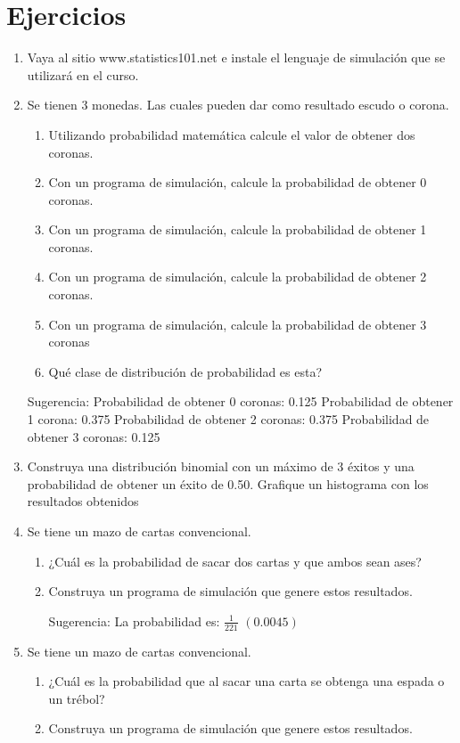  
\section{Ejercicios}

\begin{enumerate}
    \renewcommand{\theenumi}{Ejercicio \arabic{enumi}} %
    \setcounter{enumi}{0} %
    \item Vaya al sitio www.statistics101.net e instale el lenguaje de simulación que se utilizará en el curso.
    \item Se tienen 3 monedas. Las cuales pueden dar como resultado escudo o corona.
        \begin{enumerate}[label=\alph*.]
        \item Utilizando probabilidad matemática calcule el valor de obtener dos coronas.
        \item Con un programa de simulación, calcule la probabilidad de obtener 0 coronas.
        \item Con un programa de simulación, calcule la probabilidad de obtener 1 coronas.
        \item Con un programa de simulación, calcule la probabilidad de obtener 2 coronas.
        \item Con un programa de simulación, calcule la probabilidad de obtener 3 coronas
        \item Qué clase de distribución de probabilidad es esta?
      \end{enumerate}

Sugerencia:
\subitem Probabilidad de obtener 0 coronas: 0.125
\subitem Probabilidad de obtener 1 corona:  0.375
\subitem Probabilidad de obtener 2 coronas: 0.375
\subitem Probabilidad de obtener 3 coronas: 0.125

    \item Construya una distribución binomial con un máximo de 3 éxitos y una probabilidad de obtener un éxito de 0.50. Grafique un histograma con los resultados obtenidos   
    \item Se tiene un mazo de cartas convencional.
    \begin{enumerate}[label=\alph*.]
        \item ¿Cuál es la probabilidad de sacar dos cartas y que ambos sean ases?
        \item Construya un programa de simulación que genere estos resultados.

Sugerencia: La probabilidad es: $\frac{1}{221}$ $(0.0045)$
      \end{enumerate}
    \item Se tiene un mazo de cartas convencional.
        \begin{enumerate}[label=\alph*.]
        \item ¿Cuál es la probabilidad que al sacar una carta se obtenga una espada o un trébol?
        \item Construya un programa de simulación que genere estos resultados.


\end{enumerate}
\end{enumerate}
